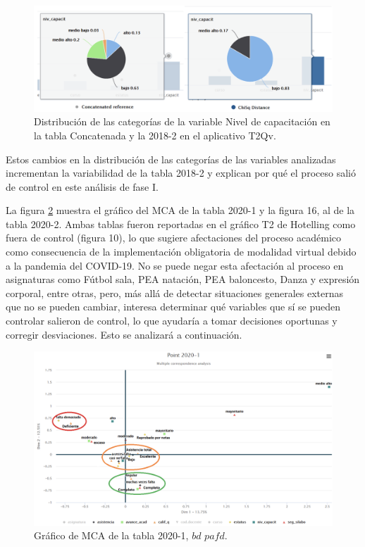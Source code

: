 \documentclass[mathematics,article,submit,moreauthors,pdftex]{mdpi}
\begin{document}
\begin{figure}[H]


\begin{center}\includegraphics[width=0.9\linewidth,]{dist20182n2} \end{center}

\caption{Distribución de las categorías de la variable Nivel de capacitación en la tabla Concatenada y la 2018-2 en el aplicativo T2Qv.}
\label{fig:dist2018n2}
\end{figure}

Estos cambios en la distribución de las categorías de las variables
analizadas incrementan la variabilidad de la tabla 2018-2 y explican por
qué el proceso salió de control en este análisis de fase I.

La figura \ref{fig:point_2020_1} muestra el gráfico del MCA de la tabla
2020-1 y la figura 16, al de la tabla 2020-2. Ambas tablas fueron
reportadas en el gráfico T2 de Hotelling como fuera de control (figura
10), lo que sugiere afectaciones del proceso académico como consecuencia
de la implementación obligatoria de modalidad virtual debido a la
pandemia del COVID-19. No se puede negar esta afectación al proceso en
asignaturas como Fútbol sala, PEA natación, PEA baloncesto, Danza y
expresión corporal, entre otras, pero, más allá de detectar situaciones
generales externas que no se pueden cambiar, interesa determinar qué
variables que sí se pueden controlar salieron de control, lo que
ayudaría a tomar decisiones oportunas y corregir desviaciones. Esto se
analizará a continuación.

\begin{figure}[H]


\begin{center}\includegraphics[width=0.9\linewidth,]{point_2020_1} \end{center}

\caption{Gráfico de MCA de la tabla 2020-1, $bd$ $pafd$.}
\label{fig:point_2020_1}
\end{figure}
\end{document}

